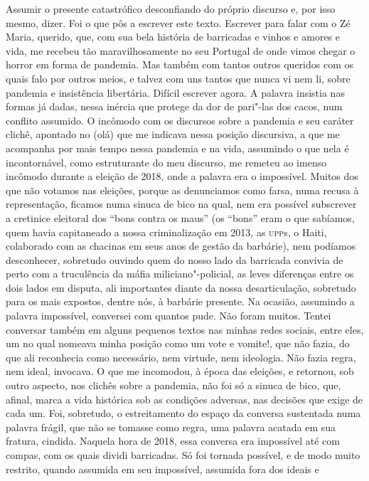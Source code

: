 Assumir o presente catastrófico desconfiando do próprio discurso e, por
isso mesmo, dizer. Foi o que pôs a escrever este texto. Escrever para
falar com o Zé Maria, querido, que, com sua bela história de barricadas
e vinhos e amores e vida, me recebeu tão maravilhosamente no seu
Portugal de onde vimos chegar o horror em forma de pandemia. Mas também
com tantos outros queridos com os quais falo por outros meios, e talvez
com uns tantos que nunca vi nem li, sobre pandemia e insistência
libertária. Difícil escrever agora. A palavra insistia nas formas já
dadas, nessa inércia que protege da dor de pari"-las dos cacos, num
conflito assumido. O incômodo com os discursos sobre a pandemia e seu
caráter clichê, apontado no (olá) que me indicava nessa posição
discursiva, a que me acompanha por mais tempo nessa pandemia e na vida,
assumindo o que nela é incontornável, como estruturante do meu discurso,
me remeteu ao imenso incômodo durante a eleição de 2018, onde a palavra
era o impossível. Muitos dos que não votamos nas eleições, porque as
denunciamos como farsa, numa recusa à representação, ficamos numa sinuca
de bico na qual, nem era possível subscrever a cretinice eleitoral dos
``bons contra os maus'' (os ``bons'' eram o que sabíamos, quem havia
capitaneado a nossa criminalização em 2013, as \textsc{upp}s, o Haiti, colaborado
com as chacinas em seus anos de gestão da barbárie), nem podíamos
desconhecer, sobretudo ouvindo quem do nosso lado da barricada convivia
de perto com a truculência da máfia miliciano"-policial, as leves
diferenças entre os dois lados em disputa, ali importantes diante da
nossa desarticulação, sobretudo para os mais expostos, dentre nós, à
barbárie presente. Na ocasião, assumindo a palavra impossível, conversei
com quantos pude. Não foram muitos. Tentei conversar também em alguns
pequenos textos nas minhas redes sociais, entre eles, um no qual nomeava
minha posição como um vote e vomite!, que não fazia, do que ali
reconhecia como necessário, nem virtude, nem ideologia. Não fazia regra,
nem ideal, invocava. O que me incomodou, à época das eleições, e
retornou, sob outro aspecto, nos clichês sobre a pandemia, não foi só a
sinuca de bico, que, afinal, marca a vida histórica sob as condições
adversas, nas decisões que exige de cada um. Foi, sobretudo, o
estreitamento do espaço da conversa sustentada numa palavra frágil, que
não se tomasse como regra, uma palavra acatada em sua fratura, cindida.
Naquela hora de 2018, essa conversa era impossível até com compas, com
os quais dividi barricadas. Só foi tornada possível, e de modo muito
restrito, quando assumida em seu impossível, assumida fora dos ideais e
